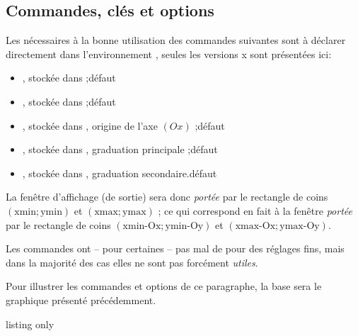 \subsection{Commandes, clés et options}

\begin{noteblock}
Les  nécessaires à la bonne utilisation des commandes suivantes sont à déclarer directement dans l'environnement , seules les versions \og x \fg{}  sont présentées ici:

\begin{itemize}
\item {}, stockée dans  ;\hfill{}défaut 
\item {}, stockée dans  ;\hfill{}défaut 
\item {}, stockée dans , origine de l'axe $(Ox)$ ;\hfill{}défaut 
\item {}, stockée dans , graduation principale ;\hfill{}défaut 
\item {}, stockée dans , graduation secondaire.\hfill{}défaut 
\end{itemize}

La fenêtre d'affichage (de sortie) sera donc \textit{portée} par le rectangle de coins $(\text{xmin};\text{ymin})$ et $(\text{xmax};\text{ymax})$ ; ce qui correspond en fait à la fenêtre \TikZ{} \textit{portée} par le rectangle de coins $(\text{xmin-Ox};\text{ymin-Oy})$ et $(\text{xmax-Ox};\text{ymax-Oy})$.

\smallskip

Les commandes ont -- pour certaines -- pas mal de  pour des réglages fins, mais dans la majorité des cas elles ne sont pas forcément \textit{utiles}.
\end{noteblock}

\begin{noteblock}
Pour illustrer les commandes et options de ce paragraphe, la base sera le graphique présenté précédemment.
\end{noteblock}

\begin{PresCodeTexPL}{listing only}
\end{PresCodeTexPL}

